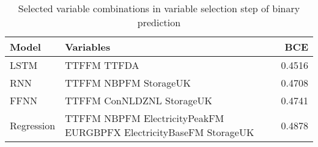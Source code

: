 \begin{table}[h!]
\centering
 \begin{adjustbox}{max width=\textwidth}
\begin{tabular}{llr}
  \hline
Model & Variables & BCE \\ 
  \hline
LSTM & TTFFM TTFDA & 0.4516 \\ 
  RNN & TTFFM NBPFM StorageUK & 0.4708 \\ 
  FFNN & TTFFM ConNLDZNL StorageUK & 0.4741 \\ 
  Regression & TTFFM NBPFM ElectricityPeakFM EURGBPFX ElectricityBaseFM StorageUK & 0.4878 \\ 
   \hline
 \end{tabular}
\end{adjustbox}
\caption{Selected variable combinations in variable selection step of binary prediction} 
\label{tab:binary.var.selection.short}
\end{table}

